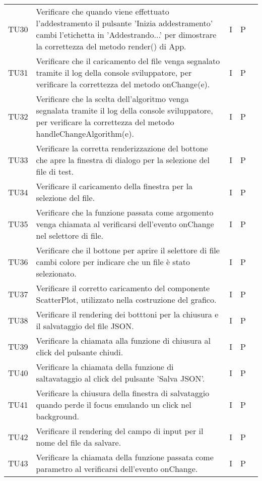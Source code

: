\begin{longtable} {
		>{}p{15mm} 
		>{}p{79.5mm}
		>{}p{15mm} 
		>{}p{15mm}
		>{}p{0mm}}
	TU30	& Verificare che quando viene effettuato l'addestramento il pulsante 'Inizia addestramento' cambi l'etichetta in 'Addestrando...' per dimostrare la correttezza del metodo render() di App. & I & P &\TBstrut \\ [2mm]
	TU31	& Verificare che il caricamento del file venga segnalato tramite il log della console sviluppatore, per verificare la correttezza del metodo onChange(e). & I & P &\TBstrut \\ [2mm]
	TU32	& Verificare che la scelta dell'algoritmo venga segnalata tramite il log della console sviluppatore, per verificare la correttezza del metodo handleChangeAlgorithm(e). & I & P &\TBstrut \\ [2mm]
	TU33	& Verificare la corretta renderizzazione del bottone che apre la finestra di dialogo per la selezione del file di test. & I & P &\TBstrut \\ [2mm]
	TU34	& Verificare il caricamento della finestra per la selezione del file. & I & P &\TBstrut \\ [2mm]
	TU35	& Verificare che la funzione passata come argomento venga chiamata al verificarsi dell'evento onChange nel selettore di file. & I & P &\TBstrut \\ [2mm]
	TU36	& Verificare che il bottone per aprire il selettore di file cambi colore per indicare che un file è stato selezionato. & I & P &\TBstrut \\ [2mm]
	TU37	& Verificare il corretto caricamento del componente ScatterPlot, utilizzato nella costruzione del grafico. & I & P &\TBstrut \\ [2mm]
	TU38	& Verificare il rendering dei botttoni per la chiusura e il salvataggio del file JSON. & I & P &\TBstrut \\ [2mm]
	TU39	& Verificare la chiamata alla funzione di chiusura al click del pulsante chiudi. & I & P &\TBstrut \\ [2mm]
	TU40	& Verificare la chiamata della funzione di saltavataggio al click del pulsante 'Salva JSON'. & I & P &\TBstrut \\ [2mm]
	TU41	& Verificare la chiusura della finestra di salvataggio quando perde il focus emulando un click nel background. & I & P &\TBstrut \\ [2mm]
	TU42	& Verificare il rendering del campo di input per il nome del file da salvare. & I & P &\TBstrut \\ [2mm]
	TU43	& Verificare la chiamata della funzione passata come parametro al verificarsi dell'evento onChange. & I & P &\TBstrut \\ [2mm]

\end{longtable}
